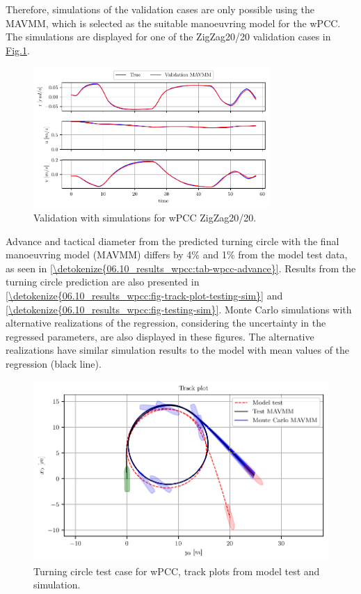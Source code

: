Therefore, simulations of the validation cases are only possible using the MAVMM, which is selected as the suitable manoeuvring model for the wPCC.
The simulations are displayed for one of the ZigZag20/20 validation cases in \hyperref[\detokenize{06.10_results_wpcc:fig-validation-sim}]{Fig.\@ \ref{\detokenize{06.10_results_wpcc:fig-validation-sim}}}.
\begin{figure}[h!]
\centering
\includegraphics[width=0.8\textwidth]{kappa/images/9.pdf}
\caption{Validation with simulations for wPCC ZigZag20/20.}\label{\detokenize{06.10_results_wpcc:fig-validation-sim}}\end{figure}
\newpage
\noindent Advance and tactical diameter \cite{imo_standards_2002} from the predicted turning circle with the final manoeuvring model (MAVMM) differs by 4\% and 1\% from the model test data, as seen in \autoref{\detokenize{06.10_results_wpcc:tab-wpcc-advance}}. Results from the turning circle prediction are also presented in  \autoref{\detokenize{06.10_results_wpcc:fig-track-plot-testing-sim}} and  \autoref{\detokenize{06.10_results_wpcc:fig-testing-sim}}. Monte Carlo simulations with alternative realizations of the regression, considering the uncertainty in the regressed parameters, are also displayed in these figures. The alternative realizations have similar simulation results to the model with mean values of the regression (black line).

\begin{figure}[h!]
\centering
\includegraphics[width=1.0\textwidth]{kappa/images/11.pdf}
\caption{Turning circle test case for wPCC, track plots from model test and simulation.}\label{\detokenize{06.10_results_wpcc:fig-track-plot-testing-sim}}\end{figure}
